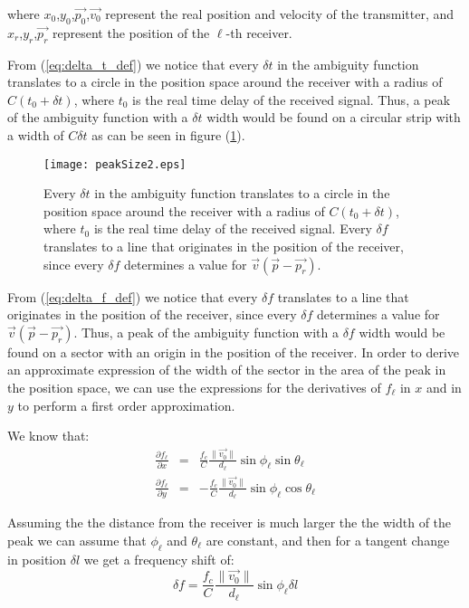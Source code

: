 where $x_0$,$y_0$,$\vec{p_0}$,$\vec{v_0}$ represent the real position and velocity of the transmitter, and $x_r$,$y_r$,$\vec{p_r}$ represent the position of the $\ell$-th receiver.

From (\ref{eq:delta_t_def}) we notice that every $\delta t$ in the ambiguity function translates to a circle in the position space around the receiver with a radius of $C(t_0+\delta t)$, where $t_0$ is the real time delay of the received signal. 
Thus, a peak of the ambiguity function with a $\delta t$ width would be found on a circular strip with a width of $C\delta t$ as can be seen in figure (\ref{fig:peakSize2}).

\begin{figure}[h]
\begin{center}
\texttt{[image: peakSize2.eps]}
\end{center}
\caption[Auto ambiguity function translation to position space]{Every $\delta t$ in the ambiguity function translates to a circle in the position space around the receiver with a radius of $C(t_0+\delta t)$, where $t_0$ is the real time delay of the received signal. Every $\delta f$ translates to a line that originates in the position of the receiver, since every $\delta f$ determines a value for $\vec{v} (\vec{p}-\vec{p_r})$. }
\label{fig:peakSize2}
\end{figure}

From (\ref{eq:delta_f_def}) we notice that every $\delta f$ translates to a line that originates in the position of the receiver, since every $\delta f$ determines a value for $\vec{v} (\vec{p}-\vec{p_r})$.
Thus, a peak of the ambiguity function with a $\delta f$ width would be found on a sector with an origin in the position of the receiver.
In order to derive an approximate expression of the width of the sector in the area of the peak in the position space, we can use the expressions for the derivatives of $f_\ell$ in $x$ and in $y$ to perform a first order approximation.

We know that:
\begin{eqnarray}
\frac{\partial f_\ell}{\partial x} &=& \frac{f_c}{C} \frac{\|\vec{v_0}\|}{d_\ell} \sin \phi_\ell\sin \theta_\ell \nonumber \\
\frac{\partial f_\ell}{\partial y} &=& -\frac{f_c}{C} \frac{\|\vec{v_0}\|}{d_\ell} \sin \phi_\ell \cos \theta_\ell  \nonumber
\end{eqnarray}

Assuming the the distance from the receiver is much larger the the width of the peak we can assume that $\phi_\ell$ and $\theta_\ell$ are constant, and then for a tangent change in position $\delta l$ we get a frequency shift of:
\begin{equation}
\delta f = \frac{f_c}{C} \frac{\|\vec{v_0}\|}{d_\ell} \sin\phi_\ell \delta l
\end{equation}

